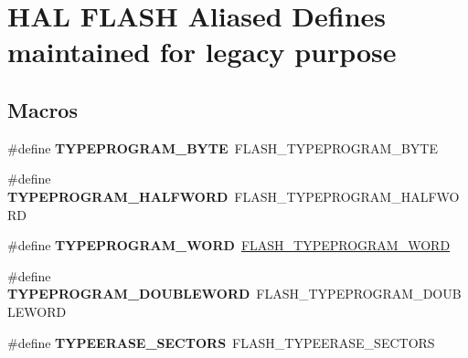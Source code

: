 \hypertarget{group___h_a_l___f_l_a_s_h___aliased___defines}{\section{H\-A\-L F\-L\-A\-S\-H Aliased Defines maintained for legacy purpose}
\label{group___h_a_l___f_l_a_s_h___aliased___defines}
}
\subsection*{Macros}
\begin{DoxyCompactItemize}
\item 
\hypertarget{group___h_a_l___f_l_a_s_h___aliased___defines_ga458b1d485bc541d4a9f2196881146026}{\#define {\bfseries T\-Y\-P\-E\-P\-R\-O\-G\-R\-A\-M\-\_\-\-B\-Y\-T\-E}~F\-L\-A\-S\-H\-\_\-\-T\-Y\-P\-E\-P\-R\-O\-G\-R\-A\-M\-\_\-\-B\-Y\-T\-E}\label{group___h_a_l___f_l_a_s_h___aliased___defines_ga458b1d485bc541d4a9f2196881146026}

\item 
\hypertarget{group___h_a_l___f_l_a_s_h___aliased___defines_ga7f3aba0ba4426991096af46fb513eb4a}{\#define {\bfseries T\-Y\-P\-E\-P\-R\-O\-G\-R\-A\-M\-\_\-\-H\-A\-L\-F\-W\-O\-R\-D}~F\-L\-A\-S\-H\-\_\-\-T\-Y\-P\-E\-P\-R\-O\-G\-R\-A\-M\-\_\-\-H\-A\-L\-F\-W\-O\-R\-D}\label{group___h_a_l___f_l_a_s_h___aliased___defines_ga7f3aba0ba4426991096af46fb513eb4a}

\item 
\hypertarget{group___h_a_l___f_l_a_s_h___aliased___defines_ga30d98b2839798f48f8a6e0289ab2677a}{\#define {\bfseries T\-Y\-P\-E\-P\-R\-O\-G\-R\-A\-M\-\_\-\-W\-O\-R\-D}~\hyperlink{group___f_l_a_s_h___type___program_gadd25c6821539030ba6711e7c0d586c3e}{F\-L\-A\-S\-H\-\_\-\-T\-Y\-P\-E\-P\-R\-O\-G\-R\-A\-M\-\_\-\-W\-O\-R\-D}}\label{group___h_a_l___f_l_a_s_h___aliased___defines_ga30d98b2839798f48f8a6e0289ab2677a}

\item 
\hypertarget{group___h_a_l___f_l_a_s_h___aliased___defines_ga12da935a6f8f2870015e55ff8aa9a7b0}{\#define {\bfseries T\-Y\-P\-E\-P\-R\-O\-G\-R\-A\-M\-\_\-\-D\-O\-U\-B\-L\-E\-W\-O\-R\-D}~F\-L\-A\-S\-H\-\_\-\-T\-Y\-P\-E\-P\-R\-O\-G\-R\-A\-M\-\_\-\-D\-O\-U\-B\-L\-E\-W\-O\-R\-D}\label{group___h_a_l___f_l_a_s_h___aliased___defines_ga12da935a6f8f2870015e55ff8aa9a7b0}

\item 
\hypertarget{group___h_a_l___f_l_a_s_h___aliased___defines_ga35d1514adec0ccd2f93cfd47f844d9ee}{\#define {\bfseries T\-Y\-P\-E\-E\-R\-A\-S\-E\-\_\-\-S\-E\-C\-T\-O\-R\-S}~F\-L\-A\-S\-H\-\_\-\-T\-Y\-P\-E\-E\-R\-A\-S\-E\-\_\-\-S\-E\-C\-T\-O\-R\-S}\label{group___h_a_l___f_l_a_s_h___aliased___defines_ga35d1514adec0ccd2f93cfd47f844d9ee}


\end{DoxyCompactItemize}
